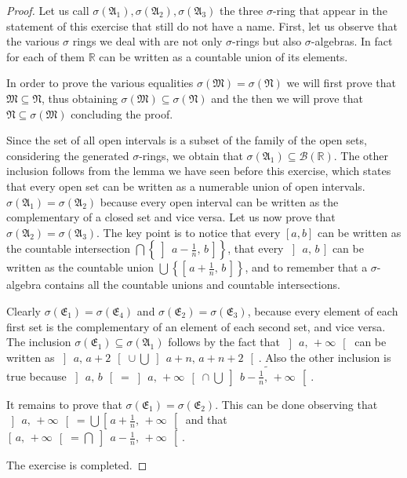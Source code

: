 \documentclass[12pt,a4paper]{article} %
\theoremstyle{plain}
\newcommand\A{\ensuremath{\mathfrak A}}                               %
\newcommand\E{\ensuremath{\mathfrak E}}                               %
\newcommand\R{\ensuremath{\mathbb R}}                                 %
\newcommand\icc[2]{\ensuremath{\left[\,#1,\,#2\,\right]}}
\newcommand\ico[2]{\ensuremath{\left[\,#1,\,#2\,\right[}}
\newcommand\ioc[2]{\ensuremath{\left]\,#1,\,#2\,\right]}}
\newcommand\ioo[2]{\ensuremath{\left]\,#1,\,#2\,\right[}}
\begin{document}
\begin{proof}
  Let us call $\sigma({\A_1}), \sigma({\A_2}), \sigma({\A_3})$ the three $\sigma$-ring that appear in the statement of this exercise that still do not have a name.
  First, let us observe that the various $\sigma$ rings we deal with are not only $\sigma$-rings but also $\sigma$-algebras.
  In fact for each of them $\R$ can be written as a countable union of its elements.

  In order to prove the various equalities $\sigma(\mathfrak{M}) = \sigma(\mathfrak{N})$ we will first prove that $\mathfrak{M} \subseteq \mathfrak{N}$, thus obtaining $\sigma(\mathfrak{M}) \subseteq \sigma(\mathfrak{N})$ and the then we will prove that $\mathfrak{N} \subseteq \sigma(\mathfrak{M})$ concluding the proof.

  Since the set of all open intervals is a subset of the family of the open sets, considering the generated $\sigma$-rings, we obtain that $\sigma(\A_1) \subseteq \mathcal{B}(\R)$. 
  The other inclusion follows from the lemma we have seen before this exercise, which states that every open set can be written as a numerable union of open intervals.
  $\sigma(\A_1) = \sigma(\A_2)$ because every open interval can be written as the complementary of a closed set and vice versa.
  Let us now prove that $\sigma(\A_2) = \sigma(\A_3)$.
  The key point is to notice that every $[a,b]$ can be written as the countable intersection $\bigcap \left\lbrace \ioc{a-\frac{1}{n}}{b}\right\rbrace$, that every $\ioc{a}{b}$ can be written as the countable union $\bigcup \left\lbrace \icc{a+\frac{1}{n}}{b}\right\rbrace$, and to remember that a $\sigma$-algebra contains all the countable unions and countable intersections.

  Clearly $\sigma(\E_1) = \sigma(\E_4)$ and $\sigma(\E_2) = \sigma(\E_3)$, because every element of each first set is the complementary of an element of each second set, and vice versa.
  The inclusion $\sigma(\E_1) \subseteq \sigma(\A_1)$ follows by the fact that $\ioo{a}{+\infty}$ can be written as $\ioo{a}{a + 2} \cup \bigcup \ioo{a+n}{a+n+2}$. 
  Also the other inclusion is true because $\ioo{a}{b} = \ioo{a}{+\infty} \cap \bigcup \widetilde{\ioo{b-\frac{1}{n}}{+\infty}}$.

It remains to prove that $\sigma(\E_1) = \sigma(\E_2)$. 
This can be done observing that $\ioo{a}{+\infty} = \bigcup \ico{a+\frac{1}{n}}{+\infty}$ and that $\ico{a}{+\infty} = \bigcap \ioo{a-\frac{1}{n}}{+\infty}$.



The exercise is completed.
\end{proof}
\end{document}
